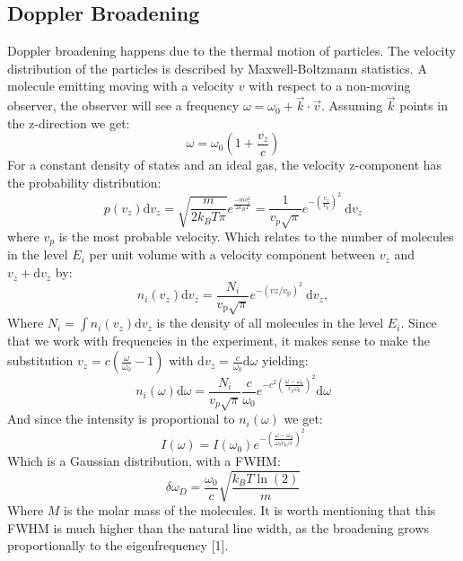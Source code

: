 \documentclass{article}
\begin{document}
\subsection{Doppler Broadening}
Doppler broadening happens due to the thermal motion of particles. The velocity distribution of the particles is described by Maxwell-Boltzmann statistics. A molecule emitting moving with a velocity $v$ with respect to a non-moving observer, the observer will see a frequency $\omega = \omega_0 + \vec{k} \cdot \vec{v}$. Assuming $\vec{k}$ points in the z-direction we get: 
\begin{equation}
    \omega = \omega_0(1+\frac{v_z}{c})
\end{equation}
For a constant density of states and an ideal gas, the velocity z-component has the probability distribution: 
\begin{equation}
    p\left(v_z\right) \mathrm{d} v_z=\sqrt{\frac{m}{2 k_B T \pi}} e^{\frac{-m v_z^2}{2k_BT}}=\frac{1}{v_p \sqrt{\pi}} e^{-\left(\frac{v_z}{v_p}\right)^2} \mathrm{~d} v_z  
\end{equation}
where $v_p$ is the most probable velocity. Which relates to the number of molecules in the level $E_i$ per unit volume with a velocity component between $v_z$ and $v_z+\mathrm{d} v_z$ by: 
\begin{equation}
    n_i\left(v_z\right) \mathrm{d} v_z=\frac{N_i}{v_{\mathrm{p}} \sqrt{\pi}} e^{-\left(v z / v_{\mathrm{p}}\right)^2} \mathrm{~d} v_z,
\end{equation}
Where $N_i=\int n_i\left(v_z\right) \mathrm{d} v_z$ is the density of all molecules in the level $E_i$. Since that we work with frequencies in the experiment, it makes sense to make the substitution $v_z = c(\frac{\omega}{\omega_0}-1)$ with $\mathrm{d}v_z = \frac{c}{\omega_0}\mathrm{d}\omega$ yielding: 
\begin{equation}
    n_i(\omega) \mathrm{d} \omega=\frac{N_i}{v_p \sqrt{\pi}} \frac{c}{\omega_0} e^{-c^2\left(\frac{\omega-\omega_0}{v_p \omega_0}\right)^2}\mathrm{d}\omega
\end{equation}
And since the intensity is proportional to $n_i(\omega)$ we get: 
\begin{equation}
    I(\omega) =I\left(\omega_0\right) e^{-\left(\frac{\omega-\omega_0}{\omega_0 v_p/c} \right)^2}
\end{equation}
Which is a Gaussian distribution, with a FWHM: 
\begin{equation}
    \delta \omega_D =\frac{\omega_0}{c} \sqrt{\frac{k_B T \ln(2)}{m}}
\end{equation}
Where $M$ is the molar mass of the molecules. It is worth mentioning that this FWHM is much higher than the natural line width, as the broadening grows proportionally to the eigenfrequency [1].
\end{document}
